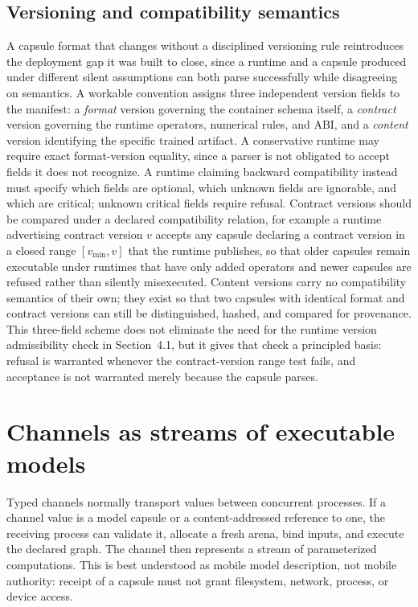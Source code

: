 \documentclass[11pt]{article}
\begin{document}
\subsection{Versioning and compatibility semantics}
A capsule format that changes without a disciplined versioning rule reintroduces the deployment gap it was built to close, since a runtime and a capsule produced under different silent assumptions can both parse successfully while disagreeing on semantics. A workable convention assigns three independent version fields to the manifest: a \emph{format} version governing the container schema itself, a \emph{contract} version governing the runtime operators, numerical rules, and ABI, and a \emph{content} version identifying the specific trained artifact. A conservative runtime may require exact format-version equality, since a parser is not obligated to accept fields it does not recognize. A runtime claiming backward compatibility instead must specify which fields are optional, which unknown fields are ignorable, and which are critical; unknown critical fields require refusal. Contract versions should be compared under a declared compatibility relation, for example a runtime advertising contract version $v$ accepts any capsule declaring a contract version in a closed range $[v_{\min}, v]$ that the runtime publishes, so that older capsules remain executable under runtimes that have only added operators and newer capsules are refused rather than silently misexecuted. Content versions carry no compatibility semantics of their own; they exist so that two capsules with identical format and contract versions can still be distinguished, hashed, and compared for provenance. This three-field scheme does not eliminate the need for the runtime version admissibility check in Section~4.1, but it gives that check a principled basis: refusal is warranted whenever the contract-version range test fails, and acceptance is not warranted merely because the capsule parses.

\section{Channels as streams of executable models}
Typed channels normally transport values between concurrent processes. If a channel value is a model capsule or a content-addressed reference to one, the receiving process can validate it, allocate a fresh arena, bind inputs, and execute the declared graph. The channel then represents a stream of parameterized computations. This is best understood as mobile model description, not mobile authority: receipt of a capsule must not grant filesystem, network, process, or device access.
\end{document}
